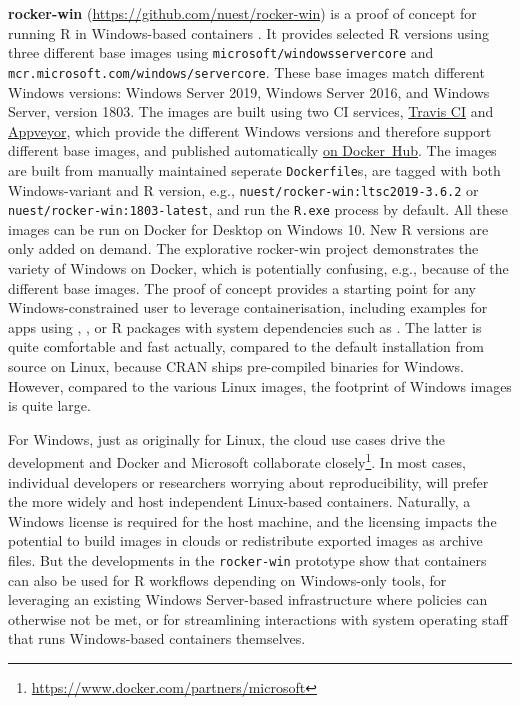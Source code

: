 \textbf{rocker-win} (\url{https://github.com/nuest/rocker-win}) is a
proof of concept for running R in Windows-based containers
\citep{nust_rocker-win_2019}. It provides selected R versions using
three different base images using \texttt{microsoft/windowsservercore}
and \texttt{mcr.microsoft.com/windows/servercore}. These base images
match different Windows versions: Windows Server 2019, Windows Server
2016, and Windows Server, version 1803. The images are built using two
CI services,
\href{https://docs.travis-ci.com/user/reference/windows/}{Travis CI} and
\href{https://www.appveyor.com/docs/windows-images-software/}{Appveyor},
which provide the different Windows versions and therefore support
different base images, and published automatically
\href{https://hub.docker.com/r/nuest/rocker-win}{on Docker~Hub}. The
images are built from manually maintained seperate \texttt{Dockerfile}s,
are tagged with both Windows-variant and R version, e.g.,
\texttt{nuest/rocker-win:ltsc2019-3.6.2} or
\texttt{nuest/rocker-win:1803-latest}, and run the \texttt{R.exe}
process by default. All these images can be run on Docker for Desktop on
Windows 10. New R versions are only added on demand. The explorative
rocker-win project demonstrates the variety of Windows on Docker, which
is potentially confusing, e.g., because of the different base images.
The proof of concept provides a starting point for any
Windows-constrained user to leverage containerisation, including
examples for apps using , , or R
packages with system dependencies such as . The latter is
quite comfortable and fast actually, compared to the default
installation from source on Linux, because CRAN ships pre-compiled
binaries for Windows. However, compared to the various Linux images, the
footprint of Windows images is quite large.

For Windows, just as originally for Linux, the cloud use cases drive the
development and Docker and Microsoft collaborate
closely\footnote{\href{https://www.docker.com/partners/microsoft}{https://www.docker.com/partners/microsoft}}.
In most cases, individual developers or researchers worrying about
reproducibility, will prefer the more widely and host independent
Linux-based containers. Naturally, a Windows license is required for the
host machine, and the licensing impacts the potential to build images in
clouds or redistribute exported images as archive files. But the
developments in the \texttt{rocker-win} prototype show that containers
can also be used for R workflows depending on Windows-only tools, for
leveraging an existing Windows Server-based infrastructure where
policies can otherwise not be met, or for streamlining interactions with
system operating staff that runs Windows-based containers themselves.

